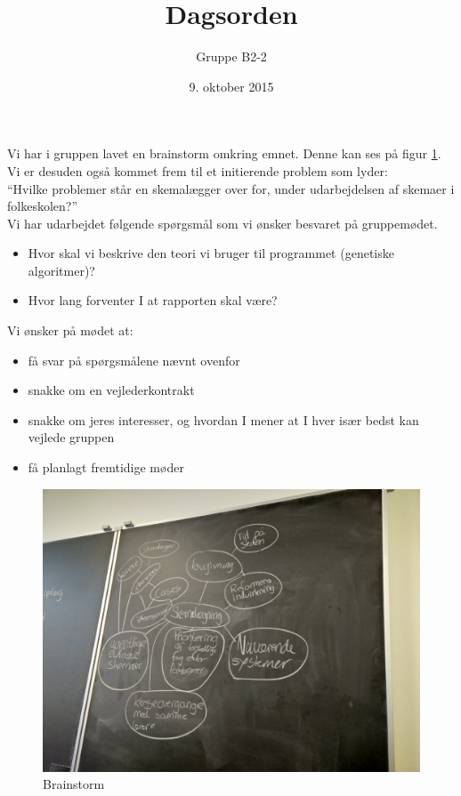 \documentclass[hidelinks, 12pt]{article}
\newcommand{\group}{B2-2}
\begin{document}
	
	\title{Dagsorden}
	\author{Gruppe \group}
	\date{9. oktober 2015}
	\maketitle
	
	\noindent Vi har i gruppen lavet en brainstorm omkring emnet. Denne kan ses på figur \ref{fig:brainstorm}. Vi er desuden også kommet frem til et initierende problem som lyder:\\

	``Hvilke problemer står en skemalægger over for, under udarbejdelsen af skemaer i folkeskolen?''\\

	\noindent Vi har udarbejdet følgende spørgsmål som vi ønsker besvaret på gruppemødet.

	\begin{itemize}
		\item Hvor skal vi beskrive den teori vi bruger til programmet (genetiske algoritmer)?
		\item Hvor lang forventer I at rapporten skal være?
	\end{itemize}

	\noindent Vi ønsker på mødet at:
	\begin{itemize}
		\item få svar på spørgsmålene nævnt ovenfor
		\item snakke om en vejlederkontrakt
		\item snakke om jeres interesser, og hvordan I mener at I hver især bedst kan vejlede gruppen 
		\item få planlagt fremtidige møder
	\end{itemize}
	
	\begin{figure}[t!]
	\centering
		\includegraphics[width=\textwidth]{brainstorm}
		\caption{Brainstorm}
		\label{fig:brainstorm}

	\end{figure}
\end{document}
